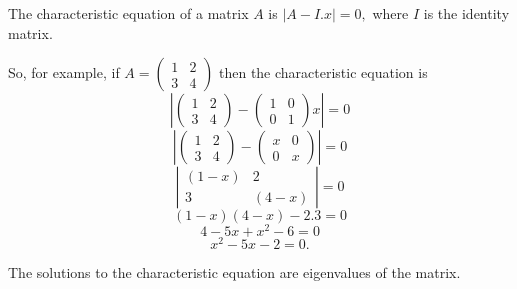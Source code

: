 The characteristic equation of a matrix $A$ is $|A - I.x| = 0,$ where $I$ is the identity matrix.
\par
So, for example, if 
$A = \left( 
\begin{array}{cc} 
  1 & 2 \\ 
  3 & 4 
\end{array} 
\right) $ then the
characteristic equation is 
\[ \left| \left( 
\begin{array}{cc}
  1 & 2 \\ 
  3 & 4 
\end{array} 
\right) -
\left( 
\begin{array}{cc}
  1 & 0 \\
  0 & 1 
\end{array} 
\right) x \right | = 0\]
\[ \left| \left( 
\begin{array}{cc} 
  1 & 2 \\
  3 & 4 
\end{array} 
\right) - \left( 
\begin{array}{cc} 
  x & 0 \\
  0 & x 
\end{array}
\right) 
\right| = 0 \]
\[ \left| 
\begin{array}{cc}
  (1- x ) & 2 \\
  3 & (4-  x ) 
\end{array}
\right| = 0 
\]
\[ (1- x)(4- x) - 2.3 = 0 \]
\[ 4 -5 x + x^2 -6 = 0 \]
\[ x^2 -5 x -2 = 0. \]
\par
The solutions to the characteristic equation are eigenvalues of the matrix.